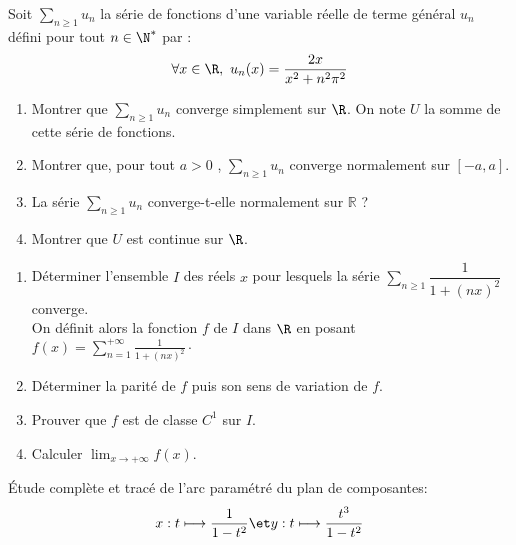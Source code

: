 \documentclass[twoside,a4paper,french,10pt]{VcCours}
\begin{document}
\begin{Exercice}
Soit $\sum_{n \geq 1} u_n$ la série de fonctions d'une variable réelle de terme général $u_n$ défini pour tout $n \in \N^*$ par : 
$$ \forall x \in \R ,\ u_n(x)=\dfrac{2x}{x^2+n^2\pi^2}$$
\begin{enumerate}
\item Montrer que $\sum_{n \geq 1} u_n$ converge simplement sur $\R$. On note $U$ la somme de cette  série de fonctions.
\item Montrer que, pour tout $a > 0$ , $\sum_{n \geq 1} u_n$ converge normalement sur $[-a,a]$.
\item La série $\sum_{n \geq 1} u_n$ converge-t-elle normalement sur $\mathbb{R}$ ?
\item Montrer que $U$ est continue sur $\R$.
\end{enumerate}
\end{Exercice} 

\begin{Exercice}
\begin{enumerate}
    \item Déterminer l'ensemble $I$ des réels $x$ pour lesquels la série $\sum_{n\geq 1} \dfrac{1}{1+(nx)^2}$ converge.\\
    On définit alors la fonction $f$ de $I$ dans $\R$ en posant $f(x)=\sum_{n=1}^{+\infty}\frac{1}{1+(nx)^2}\cdot$
    \item Déterminer la parité de $f$ puis son sens de variation de $f$. 
    \item Prouver que $f$ est de classe $C^1$ sur $I$.
    \item Calculer $\lim_{x\to +\infty}f(x)$.
    \end{enumerate}
\end{Exercice}

\begin{Exercice}
  Étude complète et tracé de l'arc paramétré du plan de composantes:
  \[x:t\longmapsto\frac{1}{1-t^2} \et y:t\longmapsto\frac{t^3}{1-t^2}\]  
\end{Exercice} 
\end{document}

